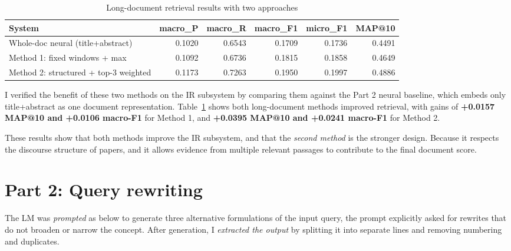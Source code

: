 \documentclass[a4paper,11pt]{article}
\begin{document}
\begin{table}[t]
  \centering
  \begin{tabular}{lrrrrr}
  \toprule
  System & macro\_P & macro\_R & macro\_F1 & micro\_F1 & MAP@10 \\
  \midrule
  Whole-doc neural (title+abstract) & 0.1020 & 0.6543 & 0.1709 & 0.1736 & 0.4491 \\
  Method 1: fixed windows + max & 0.1092 & 0.6736 & 0.1815 & 0.1858 & 0.4649 \\
  Method 2: structured + top-3 weighted & 0.1173 & 0.7263 & 0.1950 & 0.1997 & 0.4886 \\
  \midrule
  \end{tabular}
  \caption{Long-document retrieval results with two approaches}
  \label{tab:longdocs-results}
\end{table}
I verified the benefit of these two methods on the IR subsystem by comparing them against the
Part 2 neural baseline, which embeds only title+abstract as one document representation.
Table~\ref{tab:longdocs-results} shows both long-document methods improved retrieval, with gains of \textbf{+0.0157 MAP@10 and +0.0106 macro-F1} for Method 1, and \textbf{+0.0395 MAP@10 and +0.0241 macro-F1}
for Method 2.

These results show that both methods improve the IR subsystem, and that the \emph{second method}
is the stronger design. Because it respects the discourse structure of papers, and it
allows evidence from multiple relevant passages to contribute to the final document score.
\newpage
\section*{Part 2: Query rewriting}

The LM was \emph{prompted} as below to generate three alternative formulations of the input query, the prompt explicitly asked for rewrites that do not broaden or narrow the concept. After generation, I \emph{extracted the output} by splitting it into separate lines and removing numbering and duplicates.
\end{document}
